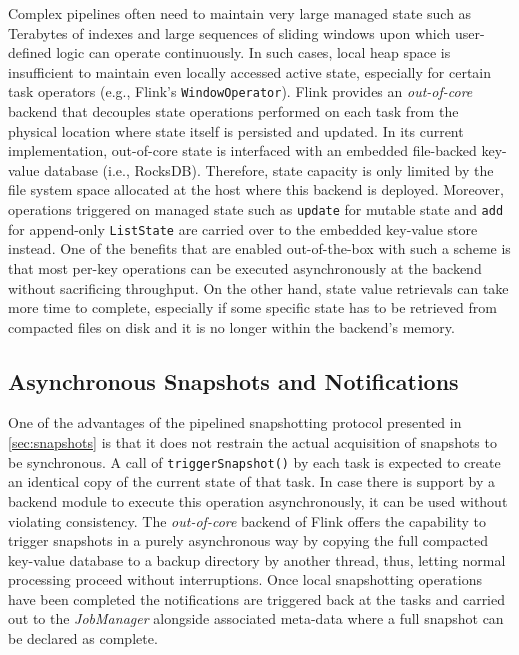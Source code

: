 Complex pipelines often need to maintain very large managed state such as Terabytes of indexes and large sequences of sliding windows upon which user-defined logic can operate continuously. In such cases, local heap space is insufficient to maintain even locally accessed active state, especially for certain task operators (e.g., Flink's \texttt{WindowOperator}). Flink provides an \emph{out-of-core} backend that decouples state operations performed on each task from the physical location where state itself is persisted and updated. In its current implementation, out-of-core state is interfaced with an embedded file-backed key-value database (i.e., RocksDB). Therefore, state capacity is only limited by the file system space allocated at the host where this backend is deployed. Moreover, operations triggered on managed state such as \texttt{update} for mutable state and \texttt{add} for append-only \texttt{ListState} are carried over to the embedded key-value store instead. One of the benefits that are enabled out-of-the-box with such a scheme is that most per-key operations can be executed asynchronously at the backend without sacrificing throughput. On the other hand, state value retrievals can take more time to complete, especially if some specific state has to be retrieved from compacted files on disk and it is no longer within the backend's memory. 

\subsection{Asynchronous Snapshots and Notifications}
One of the advantages of the pipelined snapshotting protocol presented in \autoref{sec:snapshots} is that it does not restrain the actual acquisition of snapshots to be synchronous. A call of \texttt{triggerSnapshot()} by each task is expected to create an identical copy of the current state of that task. In case there is support by a backend module to execute this operation asynchronously, it can be used without violating consistency. The \emph{out-of-core} backend of Flink offers the capability to trigger snapshots in a purely asynchronous way by copying the full compacted key-value database to a backup directory by another thread, thus, letting normal processing proceed without interruptions. Once local snapshotting operations have been completed the notifications are triggered back at the tasks and carried out to the \emph{JobManager} alongside associated meta-data where a full snapshot can be declared as complete. 

